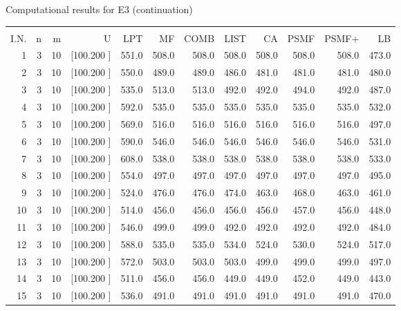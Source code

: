 \documentclass[12pt,a4paper]{article}
\begin{document}
\newpage
\begin{center}
 Computational results for E3 (continuation) {\tiny
\begin{tabular}{r r r r r r r r r r r r}\hline
    &   &   &          &        &        &        &        &        &        &        &       \\[-0.1in]
  I.N.  &  n  &  m  &  U  &  LPT  &  MF  &  COMB  &  LIST  &  CA  & PSMF &PSMF+ & LB \\[0.03in]
\hline
   1&  3& 10&[100.200   ]&   551.0&   508.0&   508.0&   508.0&   508.0&   508.0&   508.0&   473.0\\[-0.02in]
   2&  3& 10&[100.200   ]&   550.0&   489.0&   489.0&   486.0&   481.0&   481.0&   481.0&   480.0\\[-0.02in]
   3&  3& 10&[100.200   ]&   535.0&   513.0&   513.0&   492.0&   492.0&   494.0&   492.0&   487.0\\[-0.02in]
   4&  3& 10&[100.200   ]&   592.0&   535.0&   535.0&   535.0&   535.0&   535.0&   535.0&   532.0\\[-0.02in]
   5&  3& 10&[100.200   ]&   569.0&   516.0&   516.0&   516.0&   516.0&   516.0&   516.0&   497.0\\[-0.02in]
   6&  3& 10&[100.200   ]&   590.0&   546.0&   546.0&   546.0&   546.0&   546.0&   546.0&   531.0\\[-0.02in]
   7&  3& 10&[100.200   ]&   608.0&   538.0&   538.0&   538.0&   538.0&   538.0&   538.0&   533.0\\[-0.02in]
   8&  3& 10&[100.200   ]&   554.0&   497.0&   497.0&   497.0&   497.0&   497.0&   497.0&   495.0\\[-0.02in]
   9&  3& 10&[100.200   ]&   524.0&   476.0&   476.0&   474.0&   463.0&   468.0&   463.0&   461.0\\[-0.02in]
  10&  3& 10&[100.200   ]&   514.0&   456.0&   456.0&   456.0&   456.0&   457.0&   456.0&   448.0\\[-0.02in]
  11&  3& 10&[100.200   ]&   546.0&   499.0&   499.0&   492.0&   492.0&   492.0&   492.0&   484.0\\[-0.02in]
  12&  3& 10&[100.200   ]&   588.0&   535.0&   535.0&   534.0&   524.0&   530.0&   524.0&   517.0\\[-0.02in]
  13&  3& 10&[100.200   ]&   572.0&   503.0&   503.0&   503.0&   499.0&   499.0&   499.0&   497.0\\[-0.02in]
  14&  3& 10&[100.200   ]&   511.0&   456.0&   456.0&   449.0&   449.0&   452.0&   449.0&   443.0\\[-0.02in]
  15&  3& 10&[100.200   ]&   536.0&   491.0&   491.0&   491.0&   491.0&   491.0&   491.0&   470.0\\[-0.02in]

\end{tabular}}
\end{center}
\end{document}
